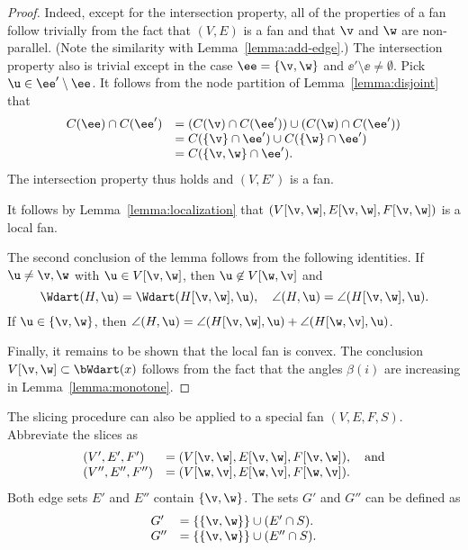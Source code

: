 \begin{proof} 
Indeed, except for the intersection property, all of the properties
of a fan follow trivially from the fact that $(V,E)$ is a fan and
that $\v$ and $\w$ are non-parallel.  (Note the similarity with
Lemma~\ref{lemma:add-edge}.)  The intersection property also is
trivial except in the case $\ee=\{\v,\w\}$ and $\ee'\setminus \ee\ne
\emptyset$.  Pick $\u\in \ee'\setminus\ee$.  It follows from the
node partition of Lemma~\ref{lemma:disjoint} that
\begin{displaymath}
\begin{array}{lll}
C(\ee) \cap C(\ee') &= (C(\v) \cap C(\ee')) \cup (C(\w)\cap C(\ee')) \\
&= C(\{\v\}\cap \ee') \cup C(\{\w\}\cap \ee') \\
&= C(\{\v,\w\}\cap \ee').
\end{array}
\end{displaymath}
The intersection property thus holds and $(V,E')$ is a fan.

It follows by Lemma~\ref{lemma:localization} that
$(V[\v,\w],E[\v,\w],F[\v,\w])$ is a local fan.

The second conclusion of the lemma follows from the following identities.
If $\u\ne \v,\w$ with $\u\in V[\v,\w]$, then $\u\not\in V[\w,\v]$ and 
\begin{equation}
\Wdart(H,\u)=\Wdart(H[\v,\w],\u),\quad \angle(H,\u) = \angle(H[\v,\w],\u).
\end{equation}
If $\u\in\{\v,\w\}$, then 
$\angle(H,\u)=\angle(H[\v,\w],\u) +\angle(H[\w,\v],\u)$.

Finally, it remains to be shown that the local fan is convex.
The conclusion $V[\v,\w]\subset \bWdart(x)$ follows from the
fact that the angles $\beta(i)$ are increasing in
Lemma~\ref{lemma:monotone}.
\end{proof}



The slicing procedure can also be applied to a special fan $(V,E,F,S)$.
Abbreviate the slices as
\begin{displaymath}
\begin{array}{lll}
(V',E',F')&=(V[\v,\w],E[\v,\w],F[\v,\w]),\quad\text{and}\\
(V'',E'',F'')&= (V[\w,\v],E[\w,\v],F[\w,\v]).
\end{array}
\end{displaymath}
Both edge sets $E'$ and $E''$ contain $\{\v,\w\}$.  The sets $G'$ and
$G''$ can be defined as
\begin{displaymath}
\begin{array}{lll}
G' &= \{\{\v,\w\}\} \cup (E'\cap S).\\
G'' &= \{\{\v,\w\}\} \cup (E''\cap S).\\
\end{array}
\end{displaymath} 


